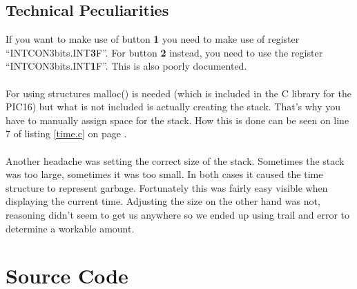 \documentclass[11pt]{article}
\begin{document}
\subsection{Technical Peculiarities}
If you want to make use of button \textbf{1} you need to make use of register ``INTCON3bits.INT\textbf{3}F''.
For button \textbf{2} instead, you need to use the register ``INTCON3bits.INT\textbf{1}F''. This is also poorly documented.
\\\\
For using structures malloc() is needed (which is included in the C library for the PIC16) but what is not included is actually creating the stack. That's why you have to manually assign space for the stack. How this is done can be seen on line 7 of listing \ref{time.c} on page \pageref{time.c}.
\\\\
Another headache was setting the correct size of the stack. Sometimes the stack was too large, sometimes it was too small. In both cases it caused the time structure to represent garbage. Fortunately this was fairly easy visible when displaying the current time. Adjusting the size on the other hand was not, reasoning didn't seem to get us anywhere so we ended up using trail and error to determine a workable amount.


\appendix

\section{Source Code}






\end{document}
